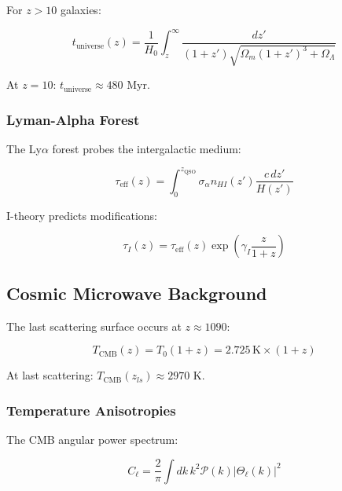 For $z > 10$ galaxies:

\begin{equation}
\label{eq:high_z_age}
t_{\text{universe}}(z) = \frac{1}{H_0} \int_z^\infty \frac{dz'}{(1+z')\sqrt{\Omega_m(1+z')^3 + \Omega_\Lambda}}
\end{equation}

At $z = 10$: $t_{\text{universe}} \approx 480$ Myr.

\subsubsection{Lyman-Alpha Forest}

The Ly$\alpha$ forest probes the intergalactic medium:

\begin{equation}
\label{eq:lya_optical_depth}
\tau_{\text{eff}}(z) = \int_0^{z_{\text{QSO}}} \sigma_{\alpha} n_{HI}(z') \frac{c\,dz'}{H(z')}
\end{equation}

I-theory predicts modifications:

\begin{equation}
\label{eq:i_optical_depth}
\tau_I(z) = \tau_{\text{eff}}(z) \exp\left(\gamma_I \frac{z}{1+z}\right)
\end{equation}

\subsection{Cosmic Microwave Background}

The last scattering surface occurs at $z \approx 1090$:

\begin{equation}
\label{eq:cmb_redshift}
T_{\text{CMB}}(z) = T_0 (1+z) = 2.725\, \text{K} \times (1+z)
\end{equation}

At last scattering: $T_{\text{CMB}}(z_{ls}) \approx 2970$ K.

\subsubsection{Temperature Anisotropies}

The CMB angular power spectrum:

\begin{equation}
\label{eq:cmb_power_spectrum}
C_\ell = \frac{2}{\pi} \int dk\, k^2 \mathcal{P}(k) |\Theta_\ell(k)|^2
\end{equation}

